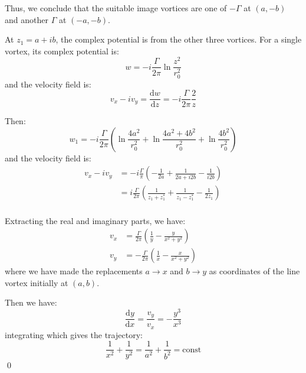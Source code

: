 \documentclass[12pt]{article}
\begin{document}
Thus, we conclude that the suitable image vortices are one of $-\Gamma$ at $(a, -b)$ and another $\Gamma$ at $(-a, -b)$.

At $z_{1} = a + ib$, the complex potential is from the other three vortices. For a single vortex, its complex potential is:
\begin{equation}
    w = -i\frac{\Gamma}{2\pi} \ln{\frac{z^{2}}{r_{0}^{2}}}
\end{equation}
and the velocity field is:
\begin{equation}
    v_{x} - iv_{y} = \frac{\mathrm{d}w}{\mathrm{d}z} = -i\frac{\Gamma}{2\pi} \frac{2}{z}
\end{equation}

Then:
\begin{equation}
    w_{1} = -i\frac{\Gamma}{2\pi} \left( \ln{\frac{4a^{2}}{r_{0}^{2}}} + \ln{\frac{4a^{2}+ 4b^{2}}{r_{0}^{2}}} + \ln{\frac{4b^{2}}{r_{0}^{2}}} \right)
\end{equation}
and the velocity field is:
\begin{equation}
    \begin{split}
        v_{x} - iv_{y} &= -i\frac{\Gamma}{\pi} \left( -\frac{1}{2a} + \frac{1}{2a + i2b} - \frac{1}{i2b} \right) \\
        &= i \frac{\Gamma}{2\pi} \left( \frac{1}{z_{1} + z_{1}^{*}} + \frac{1}{z_{1} - z_{1}^{*}} - \frac{1}{2z_{1}} \right) \\
    \end{split}
\end{equation}

Extracting the real and imaginary parts, we have:
\begin{equation}
    \begin{split}
        v_{x} &= \frac{\Gamma}{2\pi} \left( \frac{1}{y} - \frac{y}{x^{2} + y^{2}} \right) \\
        v_{y} &= -\frac{\Gamma}{2\pi} \left( \frac{1}{x} - \frac{x}{x^{2} + y^{2}} \right)
    \end{split}
\end{equation}
where we have made the replacements $a \to x$ and $b \to y$ as coordinates of the line vortex initially at $(a, b)$.

Then we have:
\begin{equation}
    \frac{\mathrm{d}y}{\mathrm{d}x} = \frac{v_{y}}{v_{x}} = -\frac{y^{3}}{x^{3}}
\end{equation}
integrating which gives the trajectory:
\begin{equation}
    \frac{1}{x^{2}} + \frac{1}{y^{2}} = \frac{1}{a^{2}} + \frac{1}{b^{2}} = \text{const}
\end{equation}
\qed
\end{document}
